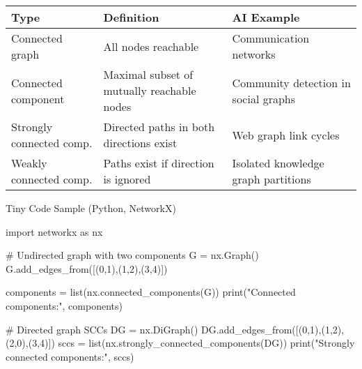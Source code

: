 \documentclass[
  letterpaper,
  DIV=11,
  numbers=noendperiod]{scrreprt}
\newenvironment{Shaded}{\begin{snugshade}}{\end{snugshade}}
\newcommand{\BuiltInTok}[1]{\textcolor[rgb]{0.00,0.23,0.31}{#1}}
\newcommand{\CommentTok}[1]{\textcolor[rgb]{0.37,0.37,0.37}{#1}}
\newcommand{\DecValTok}[1]{\textcolor[rgb]{0.68,0.00,0.00}{#1}}
\newcommand{\ImportTok}[1]{\textcolor[rgb]{0.00,0.46,0.62}{#1}}
\newcommand{\NormalTok}[1]{\textcolor[rgb]{0.00,0.23,0.31}{#1}}
\newcommand{\OperatorTok}[1]{\textcolor[rgb]{0.37,0.37,0.37}{#1}}
\newcommand{\StringTok}[1]{\textcolor[rgb]{0.13,0.47,0.30}{#1}}
\begin{document}
\begin{longtable}[]{@{}
  >{\raggedright\arraybackslash}p{}
  >{\raggedright\arraybackslash}p{}
  >{\raggedright\arraybackslash}p{}@{}}
\toprule\noalign{}
\begin{minipage}[b]{\linewidth}\raggedright
Type
\end{minipage} & \begin{minipage}[b]{\linewidth}\raggedright
Definition
\end{minipage} & \begin{minipage}[b]{\linewidth}\raggedright
AI Example
\end{minipage} \\
\midrule\noalign{}
\endhead
\bottomrule\noalign{}
\endlastfoot
Connected graph & All nodes reachable & Communication networks \\
Connected component & Maximal subset of mutually reachable nodes &
Community detection in social graphs \\
Strongly connected comp. & Directed paths in both directions exist & Web
graph link cycles \\
Weakly connected comp. & Paths exist if direction is ignored & Isolated
knowledge graph partitions \\
\end{longtable}

Tiny Code Sample (Python, NetworkX)

\begin{Shaded}
\begin{Highlighting}[]
\ImportTok{import}\NormalTok{ networkx }\ImportTok{as}\NormalTok{ nx}

\CommentTok{\# Undirected graph with two components}
\NormalTok{G }\OperatorTok{=}\NormalTok{ nx.Graph()}
\NormalTok{G.add\_edges\_from([(}\DecValTok{0}\NormalTok{,}\DecValTok{1}\NormalTok{),(}\DecValTok{1}\NormalTok{,}\DecValTok{2}\NormalTok{),(}\DecValTok{3}\NormalTok{,}\DecValTok{4}\NormalTok{)])}

\NormalTok{components }\OperatorTok{=} \BuiltInTok{list}\NormalTok{(nx.connected\_components(G))}
\BuiltInTok{print}\NormalTok{(}\StringTok{"Connected components:"}\NormalTok{, components)}

\CommentTok{\# Directed graph SCCs}
\NormalTok{DG }\OperatorTok{=}\NormalTok{ nx.DiGraph()}
\NormalTok{DG.add\_edges\_from([(}\DecValTok{0}\NormalTok{,}\DecValTok{1}\NormalTok{),(}\DecValTok{1}\NormalTok{,}\DecValTok{2}\NormalTok{),(}\DecValTok{2}\NormalTok{,}\DecValTok{0}\NormalTok{),(}\DecValTok{3}\NormalTok{,}\DecValTok{4}\NormalTok{)])}
\NormalTok{sccs }\OperatorTok{=} \BuiltInTok{list}\NormalTok{(nx.strongly\_connected\_components(DG))}
\BuiltInTok{print}\NormalTok{(}\StringTok{"Strongly connected components:"}\NormalTok{, sccs)}
\end{Highlighting}
\end{Shaded}
\end{document}
